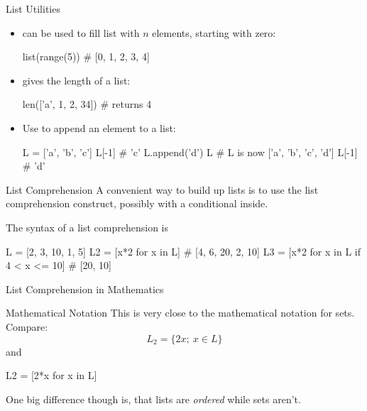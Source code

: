 \documentclass[hyperref={pdfpagelabels=false},table, handout]{beamer}
\begin{document}
\begin{frame}[fragile]{List Utilities}
\begin{itemize}[<+->]
\item {} can be used to fill list with $n$ elements, starting with zero:
\begin{python}
list(range(5))  # [0, 1, 2, 3, 4]
\end{python}
\item {} gives the \alert{length} of a list:
\begin{python}
len(['a', 1, 2, 34]) # returns 4
\end{python}
\item Use  to append an element to a list:
\begin{python}
L = ['a', 'b', 'c']
L[-1] # 'c'
L.append('d')
L     # L is now ['a', 'b', 'c', 'd']
L[-1] # 'd'
\end{python}
\end{itemize}
\end{frame}

\begin{frame}[fragile]{List Comprehension}
A convenient way to build up lists is to use the \alert{list comprehension} construct, possibly with a conditional inside.
\begin{defblock}
The syntax of a list comprehension is
\begin{python}
\end{python}
\end{defblock}
\vfill
\begin{example}
\begin{python}
L  = [2, 3, 10, 1, 5]
L2 = [x*2 for x in L] # [4, 6, 20, 2, 10]
L3 = [x*2 for x in L if 4 < x <= 10] # [20, 10]
\end{python}
\end{example}
\end{frame}

\begin{frame}[fragile]{List Comprehension in Mathematics}
\begin{block}{Mathematical Notation}
This is very close to the mathematical notation for sets. Compare:
\[L_2 = \{2x;\ x\in L\}\]
and
\begin{python}
L2 = [2*x for x in L]
\end{python}
  One big difference though is, that lists are \emph{\alert{ordered}} while sets aren't.
\end{block}
\end{frame}
\end{document}
